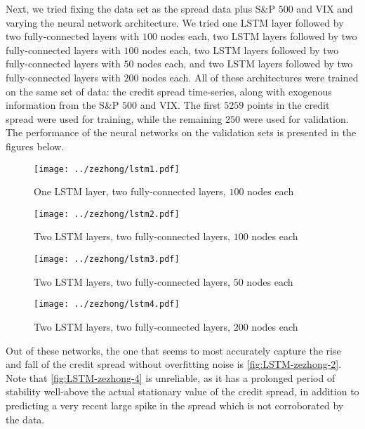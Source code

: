 \documentclass[12pt]{article}
\begin{document}
    Next, we tried fixing the data set as the spread data plus S\&P $500$ and VIX and varying the neural network architecture.
    We tried one LSTM layer followed by two fully-connected layers with $100$ nodes each,
    two LSTM layers followed by two fully-connected layers with $100$ nodes each,
    two LSTM layers followed by two fully-connected layers with $50$ nodes each,
    and two LSTM layers followed by two fully-connected layers with $200$ nodes each.
    All of these architectures were trained on the same set of data:
    the credit spread time-series, along with exogenous information from the S\&P $500$ and VIX.
    The first $5259$ points in the credit spread were used for training, while the remaining $250$ were used for validation.
    The performance of the neural networks on the validation sets is presented in the figures below.

    \begin{figure}[H]
        \centering
        \caption{One LSTM layer, two fully-connected layers, $100$ nodes each}
        \texttt{[image: ../zezhong/lstm1.pdf]}
        \label{fig:LSTM-zezhong-1}
    \end{figure}
    \begin{figure}[H]
        \centering
        \caption{Two LSTM layers, two fully-connected layers, $100$ nodes each}
        \texttt{[image: ../zezhong/lstm2.pdf]}
        \label{fig:LSTM-zezhong-2}
    \end{figure}
    \begin{figure}[H]
        \centering
        \caption{Two LSTM layers, two fully-connected layers, $50$ nodes each}
        \texttt{[image: ../zezhong/lstm3.pdf]}
        \label{fig:LSTM-zezhong-3}
    \end{figure}
    \begin{figure}[H]
        \centering
        \caption{Two LSTM layers, two fully-connected layers, $200$ nodes each}
        \texttt{[image: ../zezhong/lstm4.pdf]}
        \label{fig:LSTM-zezhong-4}
    \end{figure}

    Out of these networks, the one that seems to most accurately capture the rise and fall of the credit spread without overfitting noise is
    \autoref{fig:LSTM-zezhong-2}.
    Note that \autoref{fig:LSTM-zezhong-4} is unreliable, as it has a prolonged period of stability well-above the actual stationary value of the credit spread,
    in addition to predicting a very recent large spike in the spread which is not corroborated by the data.
\end{document}
